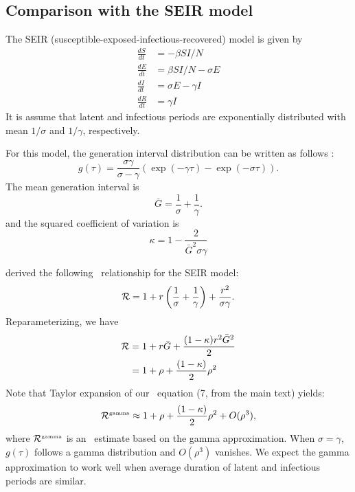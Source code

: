 
\subsection{Comparison with the SEIR model}

The SEIR (susceptible-exposed-infectious-recovered) model is given by
\begin{equation}
\begin{aligned}
\frac{dS}{dt} &= - \beta SI/N\\
\frac{dE}{dt} &= \beta SI/N - \sigma E\\
\frac{dI}{dt} &= \sigma E - \gamma I\\
\frac{dR}{dt} &= \gamma I
\end{aligned}
\end{equation}
It is assume that latent and infectious periods are exponentially distributed with mean $1/\sigma$ and $1/\gamma$, respectively.

For this model, the generation interval distribution can be written as follows \cite{Sven07}:
\begin{equation}
g({\tau}) = \frac{\sigma \gamma}{\sigma - \gamma} \left(\exp (-\gamma \tau) - \exp (- \sigma \tau) \right).
\end{equation}
The mean generation interval is
\begin{equation}
\bar{G} = \frac{1}{\sigma} + \frac{1}{\gamma}.
\end{equation}
and the squared coefficient of variation is
\begin{equation}
\kappa = 1 - \frac{2}{\bar{G}^2 \sigma \gamma}
\end{equation}

\cite{lipsitch2003transmission, roberts2007model} derived the following \rR\ relationship for the SEIR model:
\begin{equation}
{\cal R} = 1 + r\left(\frac{1}{\sigma} + \frac{1}{\gamma} \right) + \frac{r^2}{\sigma \gamma}.
\end{equation}
Reparameterizing, we have 
\begin{equation}
\begin{aligned}
{\cal R} &= 1 + r \bar{G} + \frac{(1-\kappa) r^2 {\bar{G}}^2}{2}\\
&= 1 + \rho + \frac{(1-\kappa)}{2} \rho^2
\end{aligned}
\end{equation}
Note that Taylor expansion of our \qexp\ equation (7, from the main text) yields:
\begin{equation}
{\cal R}^{{\textrm{\tiny gamma}}} \approx 1 + \rho + \frac{(1-\kappa)}{2} \rho^2 + O(\rho^3) \label{eq:taylor},
\end{equation}
where ${\cal R}^{{\textrm{\tiny gamma}}}$ is an \RR\ estimate based on the gamma approximation.
When $\sigma = \gamma$, $g(\tau)$ follows a gamma distribution and $O(\rho^3)$ vanishes.
We expect the gamma approximation to work well when average duration of latent and infectious periods are similar.

